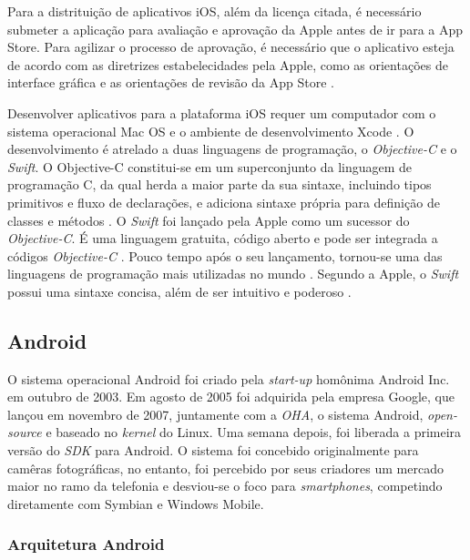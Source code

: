 Para a distrituição de aplicativos iOS, além da licença citada, é necessário submeter a aplicação para avaliação e aprovação da Apple antes de ir para a App Store. Para agilizar o processo de aprovação, é necessário que o aplicativo esteja de acordo com as diretrizes estabelecidades pela Apple, como as orientações de interface gráfica e as orientações de revisão da App Store \cite{apple_inc_submitting_2016}.

Desenvolver aplicativos para a plataforma iOS requer um computador com o sistema operacional Mac OS e o ambiente de desenvolvimento Xcode \cite{heitkotter_evaluating_2013}. 
O desenvolvimento é atrelado a duas linguagens de programação, o \textit{Objective-C} e o \textit{Swift}.
O Objective-C constitui-se em um superconjunto da linguagem de programação C, da qual herda a maior parte da sua sintaxe, incluindo tipos primitivos e fluxo de declarações, e adiciona sintaxe própria para definição de classes e métodos \cite{apple_inc_about_2014}. 
O \textit{Swift} foi lançado pela Apple como um sucessor do \textit{Objective-C}. É uma linguagem gratuita, código aberto e pode ser integrada a códigos \textit{Objective-C} \cite{apple_inc_swift_2016}. Pouco tempo após o seu lançamento, tornou-se uma das linguagens de programação mais utilizadas no mundo \cite{rebouas_empirical_2016}. Segundo a Apple, o \textit{Swift} possui uma sintaxe concisa, além de ser intuitivo e poderoso \cite{apple_inc_swift_2016}.

\subsection{Android} \label{subsection:android}

O sistema operacional Android foi criado pela \textit{start-up} homônima Android Inc. em outubro de 2003. Em agosto de 2005 foi adquirida pela empresa Google, que lançou
em novembro de 2007, juntamente com a \textit{OHA}, o sistema Android, \textit{open-source} e baseado no \textit{kernel} do Linux. Uma semana depois, foi liberada a primeira versão do \textit{SDK} para Android.
O sistema foi concebido originalmente para camêras fotográficas, no entanto, foi percebido por seus criadores um mercado maior no ramo da telefonia e desviou-se o 
foco para \textit{smartphones}, competindo diretamente com Symbian e Windows Mobile.

\subsubsection{Arquitetura Android} \label{subsection:arc-android}

